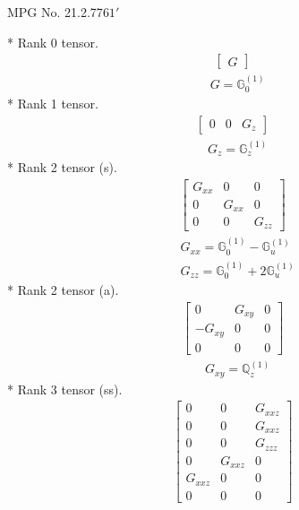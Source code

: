\documentclass[fleqn,8pt,landscape]{jsarticle}
\begin{document}
\setcounter{MaxMatrixCols}{32}

\renewcommand{\tablename}{Table~}
\renewcommand{\figurename}{Figure~}
\begin{center}
\LARGE
MPG No. 21.2.77\quad$61'$
\end{center}
* Rank 0 tensor.
\begin{align*}
\begin{bmatrix} G \end{bmatrix}
\end{align*}
\begin{align*}
& G = \mathbb{G}_{0}^{(1)}
\end{align*}
* Rank 1 tensor.
\begin{align*}
\begin{bmatrix} 0 & 0 & G_{z} \end{bmatrix}
\end{align*}
\begin{align*}
& G_{z} = \mathbb{G}_{z}^{(1)}
\end{align*}
* Rank 2 tensor (s).
\begin{align*}
\begin{bmatrix} G_{xx} & 0 & 0 \\ 0 & G_{xx} & 0 \\ 0 & 0 & G_{zz} \end{bmatrix}
\end{align*}
\begin{align*}
& G_{xx} = \mathbb{G}_{0}^{(1)} - \mathbb{G}_{u}^{(1)} \\
& G_{zz} = \mathbb{G}_{0}^{(1)} + 2 \mathbb{G}_{u}^{(1)}
\end{align*}
* Rank 2 tensor (a).
\begin{align*}
\begin{bmatrix} 0 & G_{xy} & 0 \\ - G_{xy} & 0 & 0 \\ 0 & 0 & 0 \end{bmatrix}
\end{align*}
\begin{align*}
& G_{xy} = \mathbb{Q}_{z}^{(1)}
\end{align*}
* Rank 3 tensor (ss).
\begin{align*}
\begin{bmatrix} 0 & 0 & G_{xxz} \\ 0 & 0 & G_{xxz} \\ 0 & 0 & G_{zzz} \\ 0 & G_{xxz} & 0 \\ G_{xxz} & 0 & 0 \\ 0 & 0 & 0 \end{bmatrix}
\end{align*}
\end{document}

